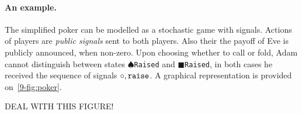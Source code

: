 \paragraph{An example.}
The simplified poker can be 
modelled as a stochastic game with signals.
Actions of players are \emph{public signals}
sent to both players.
Also their the payoff of Eve is publicly announced,
when non-zero. 
Upon choosing whether to call or fold,
Adam cannot distinguish between states
$\spadesuit${\tt Raised} and $\blacksquare${\tt Raised},
in both cases he received the sequence of signals $\circ,{\tt raise}$.
A graphical representation is provided on~\cref{9-fig:poker}.



DEAL WITH THIS FIGURE!
%
%
